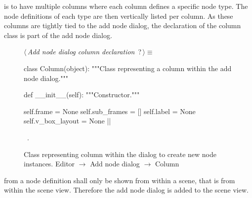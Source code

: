 \documentclass[%
    a4paper,    %
    justified,  %
    nobib,      %
    openany     %
]{tufte-book}
\begin{document}
 is to have multiple columns
where each column defines a specific node type. The node definitions of each
type are then vertically listed per column. As these columns are tightly tied to
the add node dialog, the declaration of the column class is part of the add node
dialog.

\begin{figure}
\begin{flushleft} \small
\begin{minipage}{\linewidth}\label{scrap149}\raggedright\small
{} $\langle\,${\itshape Add node dialog column declaration}\nobreak\ {\footnotesize {?}}$\,\rangle\equiv$
\vspace{-1ex}
\begin{pythoncode}
class Column(object):
    """Class representing a column within the add node dialog."""

    def __init__(self):
        """Constructor."""

        self.frame         = None
        self.sub_frames    = []
        self.label         = None
        self.v_box_layout  = None
|\NWsep|
\end{pythoncode}
\vspace{1.5ex}
\footnotesize
\begin{list}{}{\setlength{\itemsep}{-\parsep}\setlength{\itemindent}{-\leftmargin}}
\item \NWtxtMacroRefIn\ .

\item{}
\end{list}
\end{minipage}\vspace{4ex}
\end{flushleft}
\caption{Class representing column within the dialog to create new node
  instances.
  \newline{}\newline{}Editor $\rightarrow$ Add node dialog $\rightarrow$ Column}
\label{editor:lst:add-node-dialog:column}
\end{figure}


 from a node definition shall
only be shown from within a scene, that is from within the scene view. Therefore
the add node dialog is added to the scene view.
\end{document}
